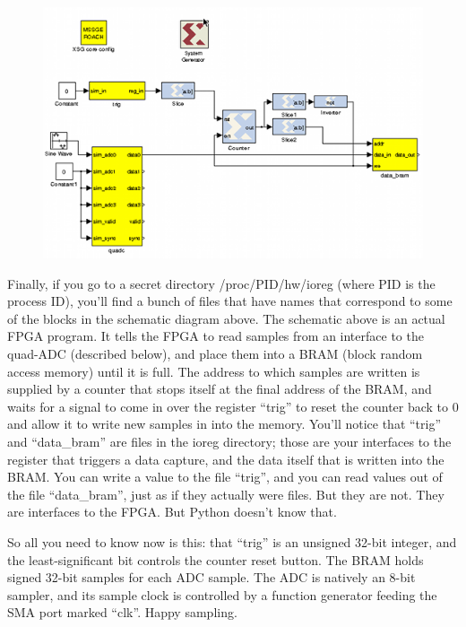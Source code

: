 \documentclass[11pt]{article}
\begin{document}
\begin{figure}\centering
\includegraphics[width=6in]{plots/adc_capture.png}
\end{figure}

Finally, if you go to a secret directory /proc/PID/hw/ioreg (where PID is the process ID), you'll find
a bunch of files that have names that correspond to some of the blocks in the schematic diagram above.
The schematic above is an actual FPGA program.  It tells the FPGA to read samples from an interface to
the quad-ADC (described below), and place them into a BRAM (block random access memory) until it is full.
The address to which samples are written is supplied by a counter that stops itself at the final address
of the BRAM, and waits for a signal to come in over the register ``trig'' to reset the counter back to
0 and allow it to write new samples in into the memory.  You'll notice that ``trig'' and ``data\_bram''
are files in the ioreg directory; those are your interfaces to the register that triggers a data capture,
and the data itself that is written into the BRAM.  You can write a value to the file ``trig'', and you can
read values out of the file ``data\_bram'', just as if they actually were files.  But they are not.  They
are interfaces to the FPGA.  But Python doesn't know that.

So all you need to know now is this: that ``trig'' is an unsigned 32-bit integer, and the least-significant bit
controls the counter reset button.  The BRAM holds signed 32-bit samples for each ADC sample.  The
ADC is natively an 8-bit sampler, and its sample clock is controlled by a function generator feeding the
SMA port marked ``clk''.  Happy sampling.
\end{document}
